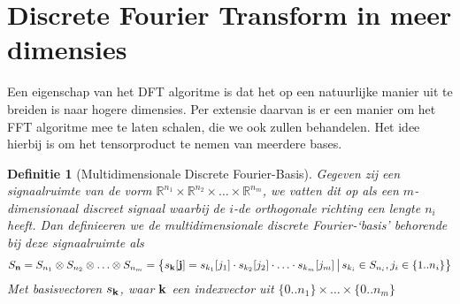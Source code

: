 \documentclass[11pt]{report}
\newcommand{\R}{\mathbb{R}}
\newtheorem*{definitie}{Definitie}
\theoremstyle{remark}
\newcommand{\eq}[1]{\begin{eqnarray*} #1 \end{eqnarray*}}
\newcommand{\largediv}{\,\big|\,}
\begin{document}
\section{Discrete Fourier Transform in meer dimensies}
Een eigenschap van het DFT algoritme is dat het op een natuurlijke manier uit te breiden is naar hogere dimensies.
Per extensie daarvan is er een manier om het FFT algoritme mee te laten schalen, die we ook zullen behandelen.
Het idee hierbij is om het tensorproduct te nemen van meerdere bases.

\begin{definitie}[Multidimensionale Discrete Fourier-Basis] 
Gegeven zij een signaalruimte van de vorm
$\R^{n_1} \times \R^{n_2} \times \ldots \times \R^{n_m}$, we vatten dit op als
een $m$-dimensionaal discreet signaal waarbij de $i$-de orthogonale richting een lengte $n_i$ heeft.
Dan definieeren we de multidimensionale discrete Fourier-`basis' behorende bij deze signaalruimte als
\eq{
  S_{\bold n}= S_{n_1}\otimes S_{n_2} \otimes \ldots \otimes S_{n_m} = 
  \left\{s_{\bold k}[{\bold j}]  = s_{k_1}[j_1]\cdot s_{k_2}[j_2]\cdot\ldots\cdot s_{k_m}[j_m] 
  \largediv s_{k_i} \in S_{n_i}, j_i \in \{1..n_i\} \right\}
}
Met basisvectoren $s_{\bold k}$, waar $\bold k$ een indexvector uit $\{0..n_1\}\times\ldots\times\{0..n_m\}$
\end{definitie}
\end{document}
